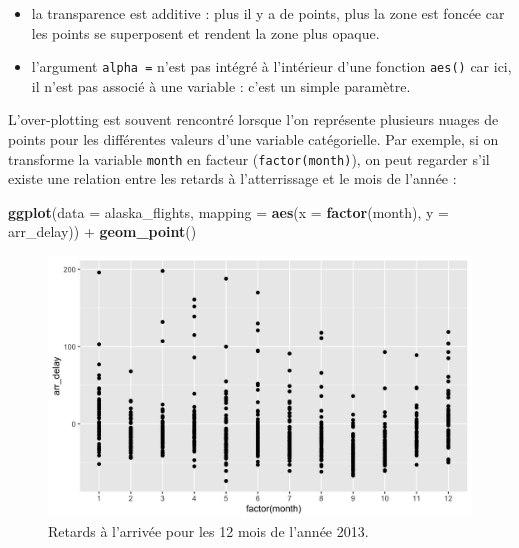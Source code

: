 \documentclass[
  a4paper,
]{article}
\newenvironment{Shaded}{\begin{snugshade}}{\end{snugshade}}
\newcommand{\DataTypeTok}[1]{\textcolor[rgb]{0.00,0.34,0.68}{#1}}
\newcommand{\KeywordTok}[1]{\textcolor[rgb]{0.12,0.11,0.11}{\textbf{#1}}}
\newcommand{\NormalTok}[1]{\textcolor[rgb]{0.12,0.11,0.11}{#1}}
\newcommand{\OperatorTok}[1]{\textcolor[rgb]{0.12,0.11,0.11}{#1}}
\newcommand{\StringTok}[1]{\textcolor[rgb]{0.75,0.01,0.01}{#1}}
\providecommand{\tightlist}{%
  \setlength{\itemsep}{0pt}\setlength{\parskip}{0pt}}
\begin{document}
\begin{itemize}
\tightlist
\item
  la transparence est additive : plus il y a de points, plus la zone est foncée car les points se superposent et rendent la zone plus opaque.
\item
  l'argument \texttt{alpha\ =} n'est pas intégré à l'intérieur d'une fonction \texttt{aes()} car ici, il n'est pas associé à une variable : c'est un simple paramètre.
\end{itemize}

L'over-plotting est souvent rencontré lorsque l'on représente plusieurs nuages de points pour les différentes valeurs d'une variable catégorielle. Par exemple, si on transforme la variable \texttt{month} en facteur (\texttt{factor(month)}), on peut regarder s'il existe une relation entre les retards à l'atterrissage et le mois de l'année :

\begin{Shaded}
\begin{Highlighting}[]
\KeywordTok{ggplot}\NormalTok{(}\DataTypeTok{data =}\NormalTok{ alaska_flights, }
       \DataTypeTok{mapping =} \KeywordTok{aes}\NormalTok{(}\DataTypeTok{x =} \KeywordTok{factor}\NormalTok{(month), }\DataTypeTok{y =}\NormalTok{ arr_delay)) }\OperatorTok{+}
\StringTok{  }\KeywordTok{geom_point}\NormalTok{()}
\end{Highlighting}
\end{Shaded}

\begin{figure}[htpb]

{\centering \includegraphics[width=0.9\linewidth]{figure/transpfactor-1} 

}

\caption{Retards à l'arrivée pour les 12 mois de l'année 2013.}\label{fig:transpfactor}
\end{figure}
\end{document}
